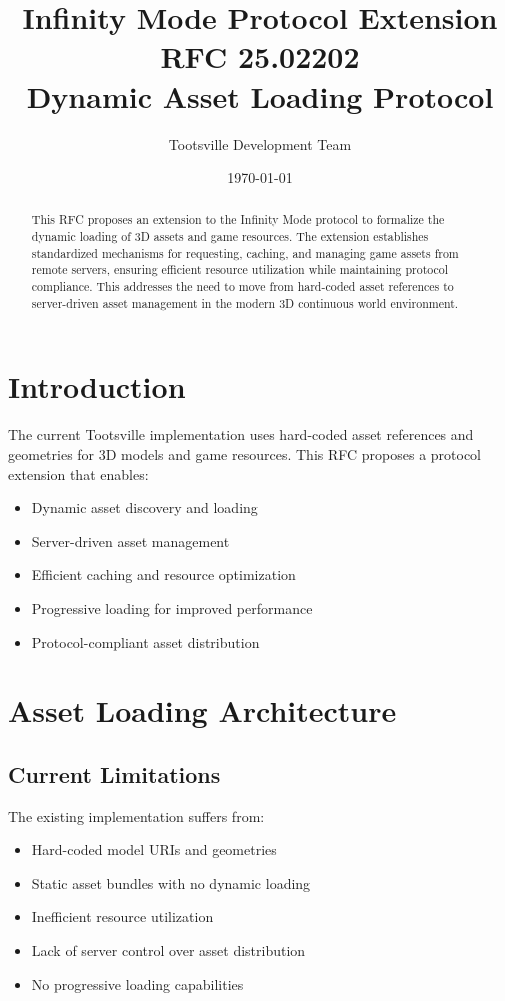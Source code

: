 \documentclass[12pt,a4paper]{article}
\title{Infinity Mode Protocol Extension\\RFC 25.02202\\Dynamic Asset Loading Protocol}
\author{Tootsville Development Team}
\date{\today}
\begin{document}
\maketitle

\begin{abstract}
This RFC proposes an extension to the Infinity Mode protocol to formalize the dynamic loading of 3D assets and game resources. The extension establishes standardized mechanisms for requesting, caching, and managing game assets from remote servers, ensuring efficient resource utilization while maintaining protocol compliance. This addresses the need to move from hard-coded asset references to server-driven asset management in the modern 3D continuous world environment.
\end{abstract}

\section{Introduction}

The current Tootsville implementation uses hard-coded asset references and geometries for 3D models and game resources. This RFC proposes a protocol extension that enables:

\begin{itemize}
\item Dynamic asset discovery and loading
\item Server-driven asset management
\item Efficient caching and resource optimization
\item Progressive loading for improved performance
\item Protocol-compliant asset distribution
\end{itemize}

\section{Asset Loading Architecture}

\subsection{Current Limitations}

The existing implementation suffers from:

\begin{itemize}
\item Hard-coded model URIs and geometries
\item Static asset bundles with no dynamic loading
\item Inefficient resource utilization
\item Lack of server control over asset distribution
\item No progressive loading capabilities
\end{itemize}
\end{document}
